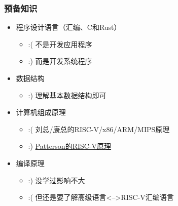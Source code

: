 \begin{frame}
    
    \frametitle{预备知识}
    
    \begin{itemize}
        
        \item 程序设计语言（汇编、C和Rust）
        \begin{itemize}
            \item :( 不是开发应用程序
            \item :) 而是开发系统程序
        \end{itemize}
        \item 数据结构
        \begin{itemize}
            \item :) 理解基本数据结构即可 
        \end{itemize}
        \item 计算机组成原理
        \begin{itemize}
            \item :( 刘总/康总的RISC-V/x86/ARM/MIPS原理 
            \item  :)  \href{http://crva.ict.ac.cn/documents/RISC-V-Reader-Chinese-v2p1.pdf}{Patterson的RISC-V原理}
        \end{itemize}
        \item 编译原理
        \begin{itemize}
            \item :) 没学过影响不大  
            \item :( 但还是要了解高级语言<-->RISC-V汇编语言
            
        \end{itemize}
        
    \end{itemize}
    
\end{frame}

